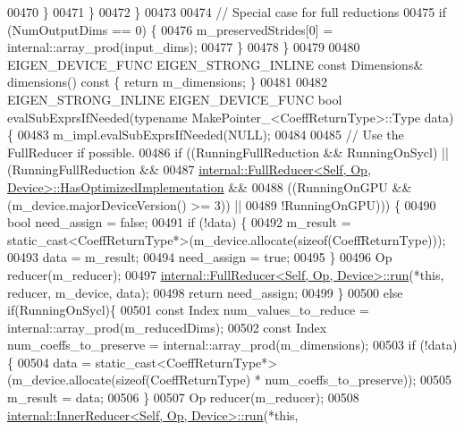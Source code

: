 \begin{DoxyCode}
00470         \}
00471       \}
00472     \}
00473 
00474     \textcolor{comment}{// Special case for full reductions}
00475     \textcolor{keywordflow}{if} (NumOutputDims == 0) \{
00476       m\_preservedStrides[0] = internal::array\_prod(input\_dims);
00477     \}
00478   \}
00479 
00480   EIGEN\_DEVICE\_FUNC EIGEN\_STRONG\_INLINE \textcolor{keyword}{const} Dimensions& dimensions()\textcolor{keyword}{ const }\{ \textcolor{keywordflow}{return} m\_dimensions; \}
00481 
00482   EIGEN\_STRONG\_INLINE EIGEN\_DEVICE\_FUNC \textcolor{keywordtype}{bool} evalSubExprsIfNeeded(\textcolor{keyword}{typename} 
      MakePointer\_<CoeffReturnType>::Type data) \{
00483     m\_impl.evalSubExprsIfNeeded(NULL);
00484 
00485     \textcolor{comment}{// Use the FullReducer if possible.}
00486     \textcolor{keywordflow}{if} ((RunningFullReduction && RunningOnSycl) ||(RunningFullReduction &&
00487         \hyperlink{struct_eigen_1_1internal_1_1_full_reducer}{internal::FullReducer<Self, Op, Device>::HasOptimizedImplementation}
       &&
00488         ((RunningOnGPU && (m\_device.majorDeviceVersion() >= 3)) ||
00489          !RunningOnGPU))) \{
00490       \textcolor{keywordtype}{bool} need\_assign = \textcolor{keyword}{false};
00491       \textcolor{keywordflow}{if} (!data) \{
00492         m\_result = \textcolor{keyword}{static\_cast<}CoeffReturnType*\textcolor{keyword}{>}(m\_device.allocate(\textcolor{keyword}{sizeof}(CoeffReturnType)));
00493         data = m\_result;
00494         need\_assign = \textcolor{keyword}{true};
00495       \}
00496       Op reducer(m\_reducer);
00497       \hyperlink{struct_eigen_1_1internal_1_1_full_reducer}{internal::FullReducer<Self, Op, Device>::run}(*\textcolor{keyword}{this}, 
      reducer, m\_device, data);
00498       \textcolor{keywordflow}{return} need\_assign;
00499     \}
00500     \textcolor{keywordflow}{else} \textcolor{keywordflow}{if}(RunningOnSycl)\{
00501       \textcolor{keyword}{const} Index num\_values\_to\_reduce = internal::array\_prod(m\_reducedDims);
00502       \textcolor{keyword}{const} Index num\_coeffs\_to\_preserve = internal::array\_prod(m\_dimensions);
00503       \textcolor{keywordflow}{if} (!data) \{
00504         data = \textcolor{keyword}{static\_cast<}CoeffReturnType*\textcolor{keyword}{>}(m\_device.allocate(\textcolor{keyword}{sizeof}(CoeffReturnType) * 
      num\_coeffs\_to\_preserve));
00505         m\_result = data;
00506       \}
00507       Op reducer(m\_reducer);
00508       \hyperlink{struct_eigen_1_1internal_1_1_inner_reducer}{internal::InnerReducer<Self, Op, Device>::run}(*\textcolor{keyword}{this}, 

\end{DoxyCode}

